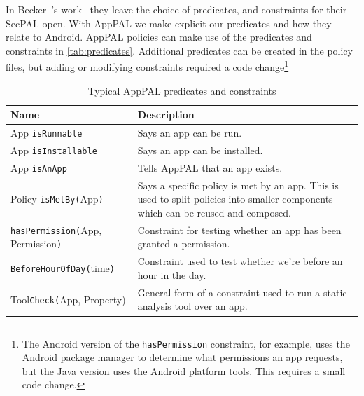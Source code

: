 \documentclass[]{llncs}
\begin{document}
In Becker~\etal's work~\cite{Becker:2006vh} they leave the choice of predicates, and constraints for their SecPAL open.
With AppPAL we make explicit our predicates and how they relate to Android.
AppPAL policies can make use of the predicates and constraints in \autoref{tab:predicates}.
Additional predicates can be created in the policy files, but adding or modifying constraints required a code change\footnote{The Android version of the \texttt{hasPermission} constraint, for example, uses the Android package manager to determine what permissions an app requests, but the Java version uses the Android platform tools.  This requires a small code change.}

\begin{table}
\begin{tabulary}{\linewidth}{l L}
  \toprule
  Name & Description \\
  \midrule
  App \texttt{isRunnable} & Says an app can be run. \\
  App \texttt{isInstallable} & Says an app can be installed. \\
  App \texttt{isAnApp} & Tells AppPAL that an app exists. \\
  Policy \texttt{isMetBy(}App\texttt{)} & Says a specific policy is met by an app.  This is used to split policies into smaller components which can be reused and composed. \\
  \texttt{hasPermission(}App, Permission\texttt{)} & Constraint for testing whether an app has been granted a permission. \\
  \texttt{BeforeHourOfDay(}time\texttt{)} & Constraint used to test whether we're before an hour in the day. \\
  Tool\texttt{Check(}App, Property) &  General form of a constraint used to run a static analysis tool over an app. \\
  \bottomrule
\end{tabulary}
\caption{Typical AppPAL predicates and constraints}
\label{tab:predicates}
\end{table}
\end{document}
